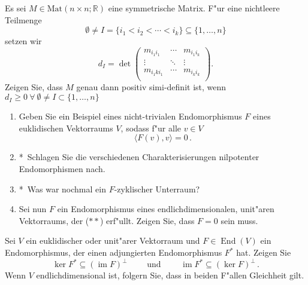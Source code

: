 \documentclass[a4,11pt]{article}
\DeclareMathOperator{\End}{End}
\DeclareMathOperator{\im}{im}
\newcommand{\bonusitem}{\item\hspace*{-2.4mm}*\ }
\begin{document}
\vspace*{-17mm}
{
\kopf
}



\begin{aufgabe}[4 Punkte]
Es sei $M \in \text{Mat}(n \times n; \mathbb{R})$ eine symmetrische Matrix. F"ur eine nichtleere Teilmenge 
\[
\emptyset \neq I = \{ i_1 < i_2 < \cdots < i_k \} \subseteq \{ 1, \dots, n\}
\]
setzen wir
\[
d_I = \det \begin{pmatrix} m_{i_1 i_1} & \cdots & m_{i_1 i_k} \\ \vdots & \ddots & \vdots \\ m_{i_1k i_1} & \cdots & m_{i_k i_k} \\ \end{pmatrix}.
\]
Zeigen Sie, dass $M$ genau dann positiv simi-definit ist, wenn $d_I \geq 0 \ \forall  \ \emptyset \neq I \subset \{ 1, \dots, n\}$
\end{aufgabe}

\begin{aufgabe}[4 Punkte]
  \begin{enumerate}
  \item Geben Sie ein Beispiel eines nicht-trivialen Endomorphismus
    $F$ eines euklidischen Vektorraums $V$, sodass f"ur alle $v \in V$
    \begin{equation}
      \tag{$**$}
      \langle F(v), v \rangle = 0 \,.
    \end{equation}
  \bonusitem Schlagen Sie die verschiedenen Charakterisierungen nilpotenter
  Endomorphismen nach.
  \bonusitem Was war nochmal ein $F$-zyklischer Unterraum?
  \item Sei nun $F$ ein Endomorphismus eines endlichdimensionalen,
    unit"aren Vektorraums, der ($**$) erf"ullt. Zeigen Sie, dass $F=0$ sein muss.
  \end{enumerate}
\end{aufgabe}

\begin{aufgabe}[4 Punkte]
  Sei $V$ ein euklidischer oder unit"arer Vektorraum und $F
  \in \End(V)$ ein Endomorphismus, der einen adjungierten
  Endomorphismus $F^*$ hat. Zeigen Sie
  $$
  \ker F^* \subseteq (\im F)^\perp \qquad \text{ und } \qquad \im F^*
  \subseteq (\ker F)^\perp \,.
  $$
  Wenn $V$ endlichdimensional ist, folgern Sie, dass in beiden F"allen
  Gleichheit gilt.
\end{aufgabe}

\end{document}
